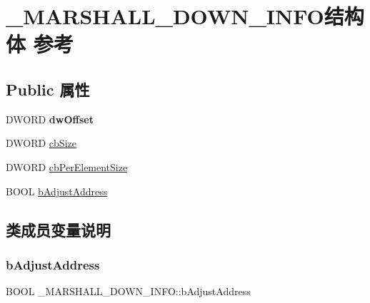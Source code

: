 \hypertarget{struct___m_a_r_s_h_a_l_l___d_o_w_n___i_n_f_o}{}\section{\+\_\+\+M\+A\+R\+S\+H\+A\+L\+L\+\_\+\+D\+O\+W\+N\+\_\+\+I\+N\+F\+O结构体 参考}
\label{struct___m_a_r_s_h_a_l_l___d_o_w_n___i_n_f_o}
\subsection*{Public 属性}
\begin{DoxyCompactItemize}
\item 
\mbox{\label{struct___m_a_r_s_h_a_l_l___d_o_w_n___i_n_f_o_abd8682b7342f261be7570f47dac1064b}} 
D\+W\+O\+RD {\bfseries dw\+Offset}
\item 
D\+W\+O\+RD \hyperlink{struct___m_a_r_s_h_a_l_l___d_o_w_n___i_n_f_o_a209465c4696e67dcf964ea76998695c0}{cb\+Size}
\item 
D\+W\+O\+RD \hyperlink{struct___m_a_r_s_h_a_l_l___d_o_w_n___i_n_f_o_a67d88eb2c721eae6ecf2cf2a64ba414d}{cb\+Per\+Element\+Size}
\item 
B\+O\+OL \hyperlink{struct___m_a_r_s_h_a_l_l___d_o_w_n___i_n_f_o_a6ea475a67ece34914ec8da527da28ffa}{b\+Adjust\+Address}
\end{DoxyCompactItemize}


\subsection{类成员变量说明}
\mbox{\label{struct___m_a_r_s_h_a_l_l___d_o_w_n___i_n_f_o_a6ea475a67ece34914ec8da527da28ffa}} 
\subsubsection{\texorpdfstring{b\+Adjust\+Address}{bAdjustAddress}}
{\footnotesize\ttfamily B\+O\+OL \+\_\+\+M\+A\+R\+S\+H\+A\+L\+L\+\_\+\+D\+O\+W\+N\+\_\+\+I\+N\+F\+O\+::b\+Adjust\+Address}

